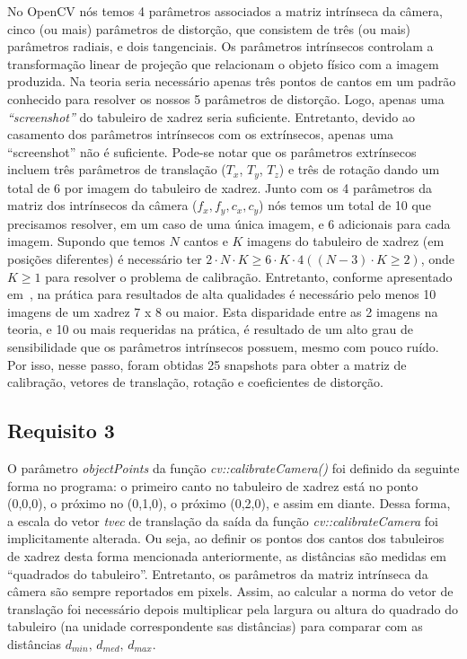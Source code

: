 \documentclass{bmvc2k}
\begin{document}
No OpenCV nós temos 4 parâmetros associados a matriz intrínseca da câmera, cinco (ou mais) parâmetros de distorção, que consistem de três (ou mais) parâmetros radiais, e dois tangenciais. Os parâmetros intrínsecos controlam a transformação linear de projeção que relacionam o objeto físico com a imagem produzida. Na teoria seria necessário apenas três pontos de cantos em um padrão conhecido para resolver os nossos 5 parâmetros de distorção. Logo, apenas uma \textit{``screenshot''} do tabuleiro de xadrez seria suficiente. Entretanto, devido ao casamento dos parâmetros intrínsecos com os extrínsecos, apenas uma ``screenshot'' não é suficiente. Pode-se notar que os parâmetros extrínsecos incluem três parâmetros de translação ($T_x$, $T_y$, $T_z$) e três de rotação dando um total de 6 por imagem do tabuleiro de xadrez. Junto com os 4 parâmetros da matriz dos intrínsecos da câmera ($f_x, f_y, c_x, c_y$) nós temos um total de 10 que precisamos resolver, em um caso de uma única imagem, e 6 adicionais para cada imagem. Supondo que temos $N$ cantos e $K$ imagens do tabuleiro de xadrez (em posições diferentes) é necessário ter $2 \cdot N \cdot K \geq 6 \cdot K \cdot 4 ((N - 3)\cdot K \geq 2)$, onde $K \ge 1$ para resolver o problema de calibração. Entretanto, conforme apresentado em~\cite{kaehler2016learning}, na prática para resultados de alta qualidades é necessário pelo menos 10 imagens de um xadrez 7 x 8 ou maior. Esta disparidade entre as 2 imagens na teoria, e 10 ou mais requeridas na prática, é resultado de um alto grau de sensibilidade que os parâmetros intrínsecos possuem, mesmo com pouco ruído. Por isso, nesse passo, foram obtidas 25 snapshots para obter a matriz de calibração, vetores de translação, rotação e coeficientes de distorção.


\subsection{Requisito 3}
O parâmetro \textit{objectPoints} da função \textit{cv::calibrateCamera()} foi definido da seguinte forma no programa: o primeiro canto no tabuleiro de xadrez está no ponto (0,0,0), o próximo no (0,1,0), o próximo (0,2,0), e assim em diante. Dessa forma, a escala do vetor \textit{tvec} de translação da saída da função \textit{cv::calibrateCamera} foi implicitamente alterada. Ou seja, ao definir os pontos dos cantos dos tabuleiros de xadrez desta forma mencionada anteriormente, as distâncias são medidas em ``quadrados do tabuleiro''. Entretanto, os parâmetros da matriz intrínseca da câmera são sempre reportados em pixels. Assim, ao calcular a norma do vetor de translação foi necessário depois multiplicar pela largura ou altura do quadrado do tabuleiro (na unidade correspondente sas distâncias) para comparar com as distâncias $d_{min},\,d_{med},\,d_{max}$. 
\end{document}
